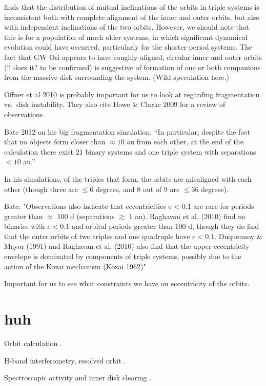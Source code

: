 \documentclass{aastex6}
\begin{document}
\citet{tokovinin97} finds that the distribution of mutual inclinations of the orbits in triple systems is inconsistent both with complete alignment of the inner and outer orbits, but also with independent inclinations of the two orbits.  However, we should note that this is for a population of much older systems, in which significant dynamical evolution could have occurred, particularly for the shorter-period systems.  The fact that GW Ori appears to have roughly-aligned, circular inner and outer orbits (!! does it?  to be confirmed) is suggestive of formation of one or both companions from the massive disk surrounding the system.  (Wild speculation here.)

Offner et al 2010 is probably important for us to look at regarding fragmentation vs.\ disk instability.  They also cite Howe \& Clarke 2009 for a review of observations.

Bate 2012 on his big fragmentation simulation: ``In particular, despite the fact that no objects form closer than $\approx 10$ au from each other, at the end of the calculation there exist 21 binary systems and one triple system with separations $<10$ au.''

In his simulations, of the triples that form, the orbits are misaligned with each other (though three are $\leq 6$ degrees, and 8 out of 9 are $\leq 36$ degrees).

Bate:  "Observations also indicate that eccentricities e < 0.1 are rare for periods greater than $\approx$ 100 d (separations $\gtrsim$ 1 au). Raghavan et al. (2010) find no binaries with $e < 0.1$ and orbital periods greater than 100 d, though they do find that the outer orbits of two triples and one quadruple have $e < 0.1$. Duquennoy \& Mayor (1991) and Raghavan et al. (2010) also find that the upper-eccentricity envelope is dominated by components of triple systems, possibly due to the action of the Kozai mechanism (Kozai 1962)"

Important for us to see what constraints we have on eccentricity of the orbits.


\section{huh}


Orbit calculation \citep{mathieu91}.

H-band interferometry, resolved orbit \citep{berger11}.

Spectroscopic activity and inner disk clearing \citep{fang14}.
\end{document}
